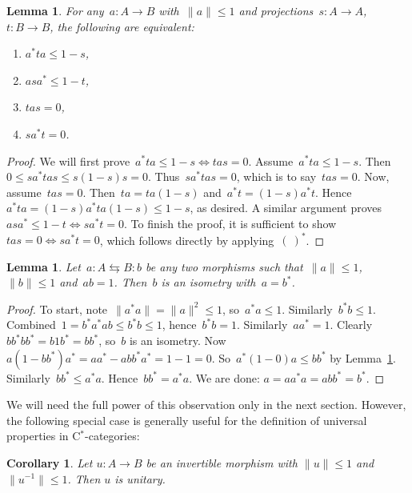 \documentclass[reqno,T1]{amsproc}
\theoremstyle{plain}
\newtheorem{lem}[thm]{Lemma}
\newtheorem{cor}[thm]{Corollary}
\theoremstyle{remark}
\numberwithin{equation}{section}
\begin{document}
\begin{lem}
For any~$a\colon A \to B$ with~$\|a\| \leq 1$
    and projections~$s \colon A \to A$,
        $t\colon B\to B$,
	the following are equivalent:
\begin{enumerate}
\item $a^* t a \leq 1-s$,
\item $a s a^* \leq 1 - t$,
\item $tas = 0$,
\item $sa^* t = 0$.
\end{enumerate}
\label{contrapositionlemma}
\end{lem}
\begin{proof}
We will first prove~$a^*t a \leq 1-s \Leftrightarrow tas=0$.
    Assume~$a^* t a \leq 1-s$.
    Then~$0 \leq s a^* t a s \leq s (1-s) s = 0$.
    Thus~$s a^* t a s = 0$, which is to say~$tas = 0$.
    Now, assume~$tas = 0$.
    Then~$ta = ta(1-s)$ and~$a^*t = (1-s)a^* t$.
    Hence~$a^* ta = (1-s)a^*ta(1-s) \leq 1-s$, as desired.
A similar argument proves~$as a^* \leq 1-t \Leftrightarrow sa^*t=0$.
To finish the proof, it is sufficient to
        show~$tas=0 \Leftrightarrow sa^*t=0$, which follows directly
        by applying~$(\ )^*$.
\end{proof}

\begin{lem}
Let~$a \colon A \leftrightarrows B \colon b$ be any two morphisms
    such that~$\|a \| \leq 1$, $\| b\| \leq 1$ and~$ab=1$.
    Then~$b$ is an isometry with~$a=b^*$.
\label{isometrylemma}
\end{lem}
\begin{proof}
    To start, note~$\|a ^*a\| = \|a\|^2 \leq 1$, so~$a^*a \leq 1$.
    Similarly~$b^*b \leq 1$.
    Combined~$1 = b^*a^*ab \leq b^*b \leq 1$, hence~$b^*b=1$.
    Similarly~$aa^*=1$.
    Clearly~$bb^*bb^* = b 1 b^* = bb^*$, so~$b$ is an isometry.
    Now~$a (1-bb^*) a^* = aa^* - abb^*a^* = 1-1=0$.
    So~$a^* (1-0) a \leq bb^*$ by Lemma~\ref{contrapositionlemma}.
    Similarly~$bb^* \leq a^*a$. Hence~$bb^*=a^*a$.
    We are done: $a = aa^*a=abb^*=b^*$.
\end{proof}

We will need the full power of this observation only in the next section. However, the following special case is generally useful for the definition of universal properties in C$^*$-categories:

\begin{cor}
Let $u : A \to B$ be an invertible morphism with $\| u \| \leq 1$ and $\| u^{-1} \| \leq 1$. Then $u$ is unitary.
\label{unitaries}
\end{cor}
\end{document}
